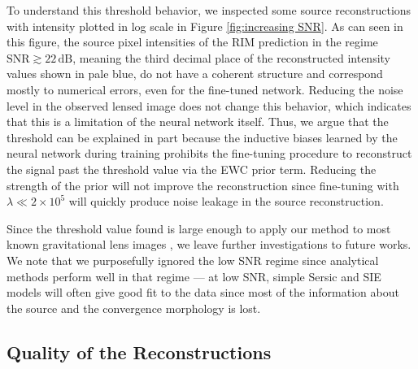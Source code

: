 To understand this threshold behavior, 
we inspected some source reconstructions with intensity plotted in log scale 
in Figure \ref{fig:increasing SNR}. As can seen in this figure, the source pixel intensities of the 
RIM prediction in the regime $\mathrm{SNR} \gtrsim 22\,\mathrm{dB}$, meaning the third decimal place of the reconstructed 
intensity values shown in pale blue, do not have a coherent structure and 
correspond mostly to numerical errors, even for the fine-tuned network. Reducing the noise 
level in the observed lensed image does not change this behavior, which indicates that this is a limitation 
of the neural network itself. Thus, we argue that the threshold can be explained in part because 
the inductive biases learned by the neural network during training prohibits the fine-tuning 
procedure to reconstruct the signal past the threshold value via the EWC prior term. Reducing the 
strength of the prior will not improve the reconstruction since fine-tuning with
$\lambda \ll 2\times 10^5$ will quickly produce noise leakage in the source reconstruction.

Since the threshold value found is large enough to apply our method to most known 
gravitational lens images \citep{Bolton2008,Shu2017},
we leave further investigations to future works.
We note that we purposefully ignored the 
low SNR regime since analytical methods perform well in that regime --- at low SNR, simple 
Sersic \citep{Sersic1963} and SIE \citep[]{keeton2001} models will often give good fit to the data 
since most of the information about the source and the convergence morphology is lost.





\subsection{Quality of the Reconstructions}\label{sec:quality of reconstructions}

